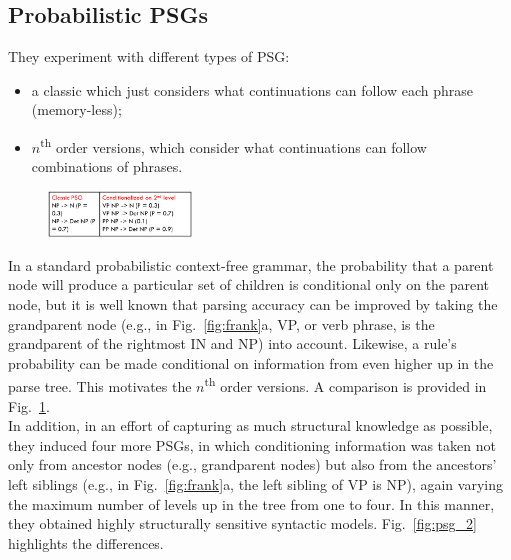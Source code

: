 \subsection{Probabilistic PSGs}
They experiment with different types of PSG:
\begin{itemize}
    \item a classic which just considers what continuations can follow each phrase (memory-less);
\end{itemize}

\begin{itemize}
    \item $n$\textsuperscript{th} order versions, which consider what continuations can follow combinations of phrases.
\end{itemize}

\begin{figure}
  \centering
  \includegraphics[width=0.34\textwidth]{images/psg.png}
  \caption{}
  \label{fig:psg}
\end{figure}

In a standard probabilistic context-free grammar, the probability that a parent node will produce a particular set of children is conditional only on the parent node, but it is well known that parsing accuracy can be improved by taking the grandparent node (e.g., in Fig.~\ref{fig:frank}a, VP, or verb phrase, is the grandparent of the rightmost IN and NP) into account. Likewise, a rule's probability can be made conditional on information from even higher up in the parse tree. This motivates the $n$\textsuperscript{th} order versions. A comparison is provided in Fig.~\ref{fig:psg}.\\

In addition, in an effort of capturing as much structural knowledge as possible, they induced four more PSGs, in which conditioning information was taken not only from ancestor nodes (e.g., grandparent nodes) but also from the ancestors' left siblings (e.g., in Fig.~\ref{fig:frank}a, the left sibling of VP is NP), again varying the maximum number of levels up in the tree from one to four. In this manner, they obtained highly structurally sensitive syntactic models. Fig.~\ref{fig:psg_2} highlights the differences.

